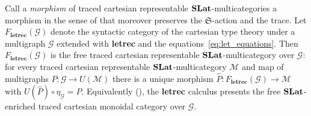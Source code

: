 \begin{theorem}
\label{theorem:letrec_freeness_details}

Call a \emph{morphism} of traced cartesian representable $\mathbf{SLat}$-multicategories a morphism in the sense of  that moreover preserves the $\mathfrak{S}$-action and the trace.
Let $F_{\textbf{letrec}}(\mathcal{G})$ denote the syntactic category of the cartesian type theory under a multigraph $\mathcal{G}$ extended with \textbf{letrec} and the equations~\eqref{eq:let_equations}.
Then $F_{\textbf{letrec}}(\mathcal{G})$ is the free traced cartesian representable $\mathbf{SLat}$-multicategory over $\mathcal{G}$: for every traced cartesian representable $\mathbf{SLat}$-multicategory $\mathcal{M}$ and map of multigraphs $P : \mathcal{G} \to U(\mathcal{M})$ there is a unique morphism $\hat{P} : F_{\textbf{letrec}}(\mathcal{G}) \to \mathcal{M}$ with $U(\hat{P}) \circ \eta_{\mathcal{G}} = P$.
Equivalently (), the \textbf{letrec} calculus presents the free $\mathbf{SLat}$-enriched traced cartesian monoidal category over $\mathcal{G}$.
\end{theorem}
